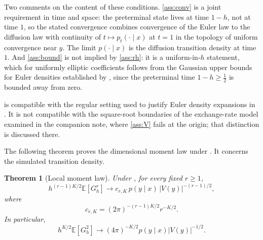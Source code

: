 \documentclass[11pt]{article}
\newtheorem{theorem}{Theorem}[section]
\theoremstyle{definition}
\newcommand{\E}{\mathbb{E}}
\begin{document}
Two comments on the content of these conditions. \ref{ass:conv} is a joint requirement in time and space: the preterminal state lives at time $1-h$, not at time $1$, so the stated convergence combines convergence of the Euler law to the diffusion law with continuity of $t\mapsto p_t(\cdot\mid x)$ at $t=1$ in the topology of uniform convergence near $y$. The limit $p(\cdot\mid x)$ is the diffusion transition density at time $1$. And \ref{ass:bound} is not implied by \ref{ass:rh}: it is a uniform-in-$h$ statement, which for uniformly elliptic coefficients follows from the Gaussian upper bounds for Euler densities established by \citet{BallyTalay1996b}, since the preterminal time $1-h\ge\tfrac12$ is bounded away from zero.

 is compatible with the regular setting used to justify Euler density expansions in \citet{BallyTalay1996a,BallyTalay1996b}. It is not compatible with the square-root boundaries of the exchange-rate model examined in the companion note, where \ref{ass:V} fails at the origin; that distinction is discussed there.

The following theorem proves the dimensional moment law under . It concerns the simulated transition density.

\begin{theorem}[Local moment law]\label{thm:local_moments}
Under , for every fixed $r\ge1$,
\begin{equation}\label{eq:general_r_moment}
 h^{(r-1)K/2}\E[G_h^r]
\longrightarrow
c_{r,K}\,p(y\mid x)\,|V(y)|^{-(r-1)/2},
\end{equation}
where
\begin{equation}\label{eq:crk}
c_{r,K}=(2\pi)^{-(r-1)K/2}r^{-K/2}.
\end{equation}
In particular,
\begin{equation}\label{eq:general_second}
 h^{K/2}\E[G_h^2]
\longrightarrow
(4\pi)^{-K/2}p(y\mid x)|V(y)|^{-1/2}.
\end{equation}
\end{theorem}
\end{document}
